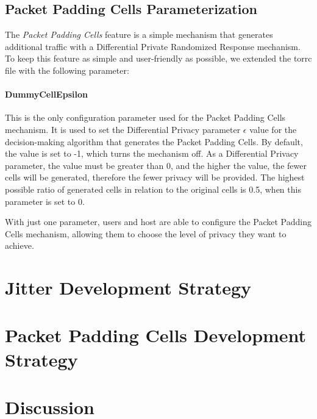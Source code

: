\subsection{Packet Padding Cells Parameterization}\label{sec:packet_padding_parameterization}

The \textit{Packet Padding Cells} feature is a simple mechanism that generates additional traffic with a Differential Private Randomized Response mechanism. To keep this feature as simple and user-friendly as possible, we extended the torrc file with the following parameter:

\paragraph{DummyCellEpsilon} This is the only configuration parameter used for the Packet Padding Cells mechanism. It is used to set the Differential Privacy parameter $\epsilon$ value for the decision-making algorithm that generates the Packet Padding Cells. By default, the value is set to -1, which turns the mechanism off. As a Differential Privacy parameter, the value must be greater than 0, and the higher the value, the fewer cells will be generated, therefore the fewer privacy will be provided. The highest possible ratio of generated cells in relation to the original cells is 0.5, when this parameter is set to 0.

With just one parameter, users and host are able to configure the Packet Padding Cells mechanism, allowing them to choose the level of privacy they want to achieve. 
\section{Jitter Development Strategy}\label{sec:jitter_development_strategy}

\section{Packet Padding Cells Development Strategy}\label{sec:packet_padding_cells_development_strategy}

\section{Discussion}\label{sec:architeture_discussion}